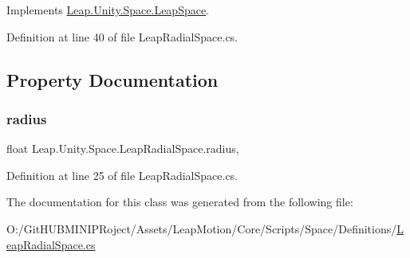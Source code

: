 Implements \mbox{\hyperlink{class_leap_1_1_unity_1_1_space_1_1_leap_space_a37ecec9c078832e89a9b71b8455df62f}{Leap.\+Unity.\+Space.\+Leap\+Space}}.



Definition at line 40 of file Leap\+Radial\+Space.\+cs.



\subsection{Property Documentation}
\mbox{\label{class_leap_1_1_unity_1_1_space_1_1_leap_radial_space_a1d081038262c174f0ccc7accc0d39897}} 
\subsubsection{\texorpdfstring{radius}{radius}}
{\footnotesize\ttfamily float Leap.\+Unity.\+Space.\+Leap\+Radial\+Space.\+radius\hspace{0.3cm}{\ttfamily [get]}, {\ttfamily [set]}}



Definition at line 25 of file Leap\+Radial\+Space.\+cs.



The documentation for this class was generated from the following file\+:\begin{DoxyCompactItemize}
\item 
O\+:/\+Git\+H\+U\+B\+M\+I\+N\+I\+P\+Roject/\+Assets/\+Leap\+Motion/\+Core/\+Scripts/\+Space/\+Definitions/\mbox{\hyperlink{_leap_radial_space_8cs}{Leap\+Radial\+Space.\+cs}}\end{DoxyCompactItemize}
